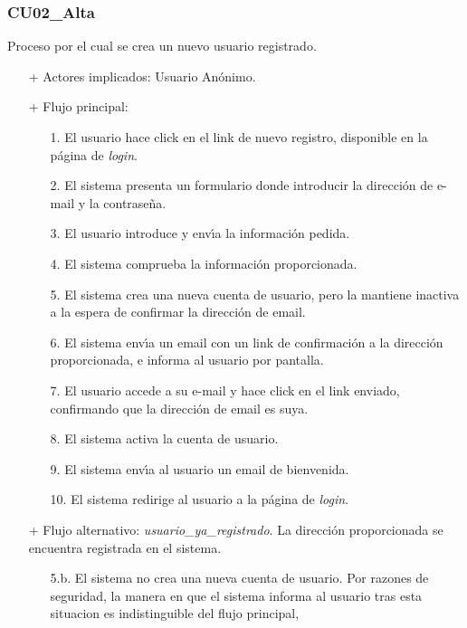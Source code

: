 \documentclass[a4paper]{report}
\begin{document}
            \subsubsection{CU02\_Alta}
            Proceso por el cual se crea un nuevo usuario registrado.
            \begin{itemize}
                \item[+] Actores implicados: Usuario An\'onimo.
                \item[+] Flujo principal:
                \begin{enumerate}
                    \item[1.] El usuario hace click en el link de nuevo registro, disponible en la p\'agina de \emph{login}.
                    \item[2.] El sistema presenta un formulario donde introducir la direcci\'on de e-mail y la contrase\~na.
                    \item[3.] El usuario introduce y env\'\i{}a la informaci\'on pedida.
                    \item[4.] El sistema comprueba la informaci\'on proporcionada.
                    \item[5.] El sistema crea una nueva cuenta de usuario, pero la mantiene inactiva a la espera de confirmar la direcci\'on de email.
                    \item[6.] El sistema env\'\i{}a un email con un link de confirmaci\'on a la direcci\'on proporcionada, e informa al usuario por pantalla.
                    \item[7.] El usuario accede a su e-mail y hace click en el link enviado, confirmando que la direcci\'on de email es suya.
                    \item[8.] El sistema activa la cuenta de usuario.
                    \item[9.] El sistema env\'\i{}a al usuario un email de bienvenida.
                    \item[10.] El sistema redirige al usuario a la p\'agina de \emph{login}.
                \end{enumerate}
                \item[+] Flujo alternativo: \emph{usuario\_ya\_registrado}. La direcci\'on proporcionada se encuentra registrada en el sistema.
                \begin{itemize}
                    \item[5.b.] El sistema no crea una nueva cuenta de usuario.
                    Por razones de seguridad, la manera en que el sistema informa al usuario tras esta situacion es indistinguible del flujo principal,

\end{itemize}
\end{itemize}
\end{document}
